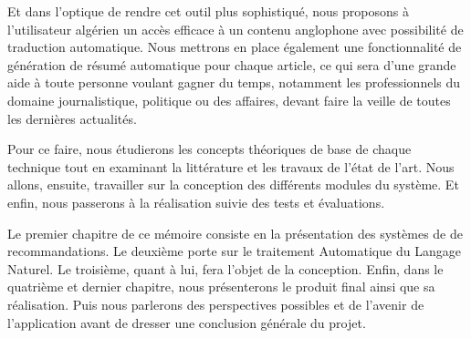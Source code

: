 Et dans l'optique de rendre cet outil plus sophistiqué, nous proposons à l'utilisateur algérien un accès efficace à un contenu anglophone avec possibilité de traduction automatique. Nous mettrons en place également une fonctionnalité de génération de résumé automatique pour chaque article, ce qui sera d'une grande aide à toute personne voulant gagner du temps, notamment les professionnels du domaine journalistique, politique ou des affaires, devant faire la veille de toutes les dernières actualités.

Pour ce faire, nous étudierons les concepts théoriques de base de chaque technique tout en examinant la littérature et les travaux de l'état de l'art. Nous allons, ensuite, travailler sur la conception des différents modules du système. Et enfin, nous passerons à la réalisation suivie des tests et évaluations.

Le premier chapitre de ce mémoire consiste en la présentation des systèmes de de recommandations. Le deuxième porte sur le  traitement Automatique du Langage Naturel. Le troisième, quant à lui, fera l'objet de la conception. Enfin, dans le quatrième et dernier chapitre, nous présenterons le produit final ainsi que sa réalisation. Puis nous parlerons des perspectives possibles et de l'avenir de l'application avant de dresser une conclusion générale du projet.

